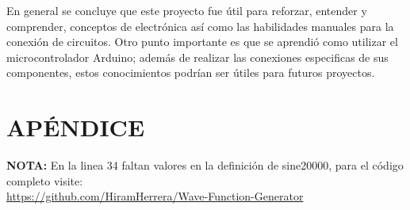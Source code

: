 \documentclass[11pt]{article}
\begin{document}
En general se concluye que este proyecto fue útil para reforzar, entender y comprender, conceptos de electrónica así como las habilidades manuales para la conexión de circuitos. Otro punto importante es que se aprendió como utilizar el microcontrolador Arduino; además de realizar las conexiones especificas de sus componentes, estos conocimientos podrían ser útiles para futuros proyectos.




\clearpage
\newpage
\section*{APÉNDICE}
\noindent
\textbf{NOTA:} En la linea 34 faltan valores en la definición de sine20000, para el código completo visite: \\
\url{https://github.com/HiramHerrera/Wave-Function-Generator}
\end{document}
